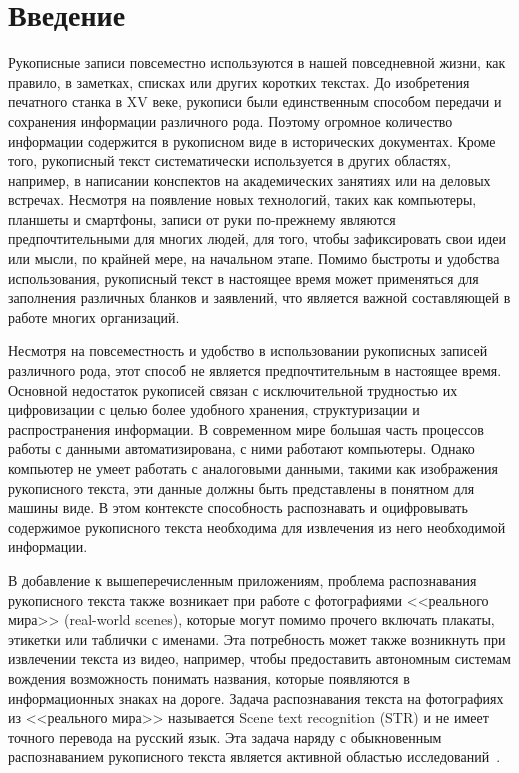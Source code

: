 \section{Введение}
\label{sec:Chapter0} 


Рукописные записи повсеместно используются в нашей повседневной жизни, как правило, в заметках, списках или других коротких текстах.
До изобретения печатного станка в XV веке, рукописи были единственным способом передачи и сохранения информации различного рода.
Поэтому огромное количество информации содержится в рукописном виде в исторических документах.
Кроме того, рукописный текст систематически используется в других областях, например, в написании конспектов на академических занятиях или на деловых встречах.
Несмотря на появление новых технологий, таких как компьютеры, планшеты и смартфоны, записи от руки по-прежнему являются предпочтительными для многих людей,
для того, чтобы зафиксировать свои идеи или мысли, по крайней мере, на начальном этапе.
Помимо быстроты и удобства использования, рукописный текст в настоящее время может применяться для заполнения различных бланков и заявлений,
что является важной составляющей в работе многих организаций.

Несмотря на повсеместность и удобство в использовании рукописных записей различного рода, этот способ не является предпочтительным в настоящее время.
Основной недостаток рукописей связан с исключительной трудностью их цифровизации с целью более удобного хранения, структуризации и распространения информации.
В современном мире большая часть процессов работы с данными автоматизирована, с ними работают компьютеры.
Однако компьютер не умеет работать с аналоговыми данными, такими как изображения рукописного текста, эти данные должны быть представлены в понятном для машины виде.
В этом контексте способность распознавать и оцифровывать содержимое рукописного текста необходима для извлечения из него необходимой информации.

В добавление к вышеперечисленным приложениям, проблема распознавания рукописного текста также возникает при работе
с фотографиями <<реального мира>> (real-world scenes), которые могут помимо прочего включать плакаты, этикетки или таблички с именами.
Эта потребность может также возникнуть при извлечении текста из видео, например, чтобы предоставить автономным системам вождения возможность понимать названия,
которые появляются в информационных знаках на дороге.
Задача распознавания текста на фотографиях из <<реального мира>> называется Scene text recognition (STR) и не имеет точного перевода на русский язык.
Эта задача наряду с обыкновенным распознаванием рукописного текста является активной областью исследований~\cite{zhu2016scene}.

